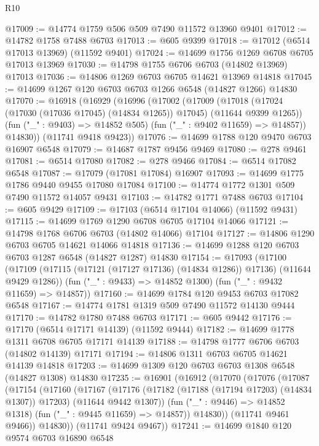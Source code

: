\begin{lexlean}{R10}
\begin{coremodule}
{{{{{{{{{{{{{{{{{{{{{{{{{{{{{{{{{{{{{{{{{{{{{{{{{{{{{{{{{{{{{{{{{{{{{{{{{{{{{{{{{{{{@17009 := @14774 @1759 @506 @509 @7490 @11572 @13960 @9401
@17012 := @14782 @1758 @7488 @6703
@17013 := @605 @9399
@17018 := @17012 (@6514 @17013 @13969) (@11592 @9401)
@17024 := @14699 @1756 @1269 @6708 @6705 @17013 @13969
@17030 := @14798 @1755 @6706 @6703 (@14802 @13969) @17013
@17036 := @14806 @1269 @6703 @6705 @14621 @13969 @14818
@17045 := @14699 @1267 @120 @6703 @6703 @1266 @6548 (@14827 @1266) @14830
@17070 := @16918
    (@16929
      (@16996
        (@17002
          (@17009
            (@17018 (@17024 (@17030 (@17036 @17045) (@14834 @1265)) @17045) (@11644 @9399 @1265))
            (fun ("_" : @9403) => @14852 @505)
            (fun ("_" : @9402 @11659) => @14857))
          @14830))
      (@11741 @9418 @9423))
@17076 := @14699 @1788 @120 @9470 @6703 @16907 @6548
@17079 := @14687 @1787 @9456 @9469
@17080 := @278 @9461
@17081 := @6514 @17080
@17082 := @278 @9466
@17084 := @6514 @17082 @6548
@17087 := @17079 (@17081 @17084) @16907
@17093 := @14699 @1775 @1786 @9440 @9455 @17080 @17084
@17100 := @14774 @1772 @1301 @509 @7490 @11572 @14057 @9431
@17103 := @14782 @1771 @7488 @6703
@17104 := @605 @9429
@17109 := @17103 (@6514 @17104 @14066) (@11592 @9431)
@17115 := @14699 @1769 @1290 @6708 @6705 @17104 @14066
@17121 := @14798 @1768 @6706 @6703 (@14802 @14066) @17104
@17127 := @14806 @1290 @6703 @6705 @14621 @14066 @14818
@17136 := @14699 @1288 @120 @6703 @6703 @1287 @6548 (@14827 @1287) @14830
@17154 := @17093
    (@17100
      (@17109 (@17115 (@17121 (@17127 @17136) (@14834 @1286)) @17136) (@11644 @9429 @1286))
      (fun ("_" : @9433) => @14852 @1300)
      (fun ("_" : @9432 @11659) => @14857))
@17160 := @14699 @1784 @120 @9453 @6703 @17082 @6548
@17167 := @14774 @1781 @1319 @509 @7490 @11572 @14130 @9444
@17170 := @14782 @1780 @7488 @6703
@17171 := @605 @9442
@17176 := @17170 (@6514 @17171 @14139) (@11592 @9444)
@17182 := @14699 @1778 @1311 @6708 @6705 @17171 @14139
@17188 := @14798 @1777 @6706 @6703 (@14802 @14139) @17171
@17194 := @14806 @1311 @6703 @6705 @14621 @14139 @14818
@17203 := @14699 @1309 @120 @6703 @6703 @1308 @6548 (@14827 @1308) @14830
@17235 := @16901
    (@16912
      (@17070
        (@17076
          (@17087
            (@17154
              (@17160
                (@17167
                  (@17176
                    (@17182 (@17188 (@17194 @17203) (@14834 @1307)) @17203)
                    (@11644 @9442 @1307))
                  (fun ("_" : @9446) => @14852 @1318)
                  (fun ("_" : @9445 @11659) => @14857))
                @14830))
            (@11741 @9461 @9466))
          @14830))
      (@11741 @9424 @9467))
@17241 := @14699 @1840 @120 @9574 @6703 @16890 @6548
}}}}}}}}}}}}}}}}}}}}}}}}}}}}}}}}}}}}}}}}}}}}}}}}}}}}}}}}}}}}}}}}}}}}}}}}}}}}}}}}}}}}
\end{coremodule}
\end{lexlean}
